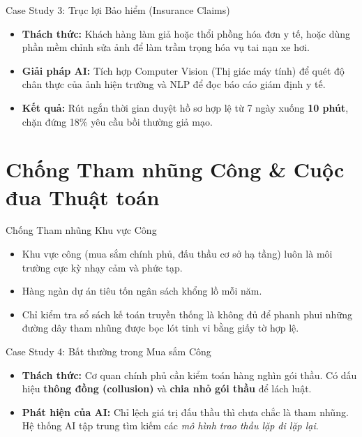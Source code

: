 \documentclass[aspectratio=169]{beamer}
\begin{document}
\begin{frame}{Case Study 3: Trục lợi Bảo hiểm (Insurance Claims)}
    \begin{itemize}
        \item \textbf{Thách thức:} Khách hàng làm giả hoặc thổi phồng hóa đơn y tế, hoặc dùng phần mềm chỉnh sửa ảnh để làm trầm trọng hóa vụ tai nạn xe hơi.
        \item \textbf{Giải pháp AI:} Tích hợp Computer Vision (Thị giác máy tính) để quét độ chân thực của ảnh hiện trường và NLP để đọc báo cáo giám định y tế.
        \item \textbf{Kết quả:} Rút ngắn thời gian duyệt hồ sơ hợp lệ từ 7 ngày xuống \textbf{10 phút}, chặn đứng 18\% yêu cầu bồi thường giả mạo.
    \end{itemize}
\end{frame}

\section{Chống Tham nhũng Công \& Cuộc đua Thuật toán}

\begin{frame}{Chống Tham nhũng Khu vực Công}
    \begin{itemize}
        \item Khu vực công (mua sắm chính phủ, đấu thầu cơ sở hạ tầng) luôn là môi trường cực kỳ nhạy cảm và phức tạp.
        \item Hàng ngàn dự án tiêu tốn ngân sách khổng lồ mỗi năm.
        \item Chỉ kiểm tra sổ sách kế toán truyền thống là không đủ để phanh phui những đường dây tham nhũng được bọc lót tinh vi bằng giấy tờ hợp lệ.
    \end{itemize}
\end{frame}

\begin{frame}{Case Study 4: Bất thường trong Mua sắm Công}
    \begin{itemize}
        \item \textbf{Thách thức:} Cơ quan chính phủ cần kiểm toán hàng nghìn gói thầu. Có dấu hiệu \textbf{thông đồng (collusion)} và \textbf{chia nhỏ gói thầu} để lách luật.
        \item \textbf{Phát hiện của AI:} Chỉ lệch giá trị đấu thầu thì chưa chắc là tham nhũng. Hệ thống AI tập trung tìm kiếm các \textit{mô hình trao thầu lặp đi lặp lại}.
    \end{itemize}
\end{frame}
\end{document}
